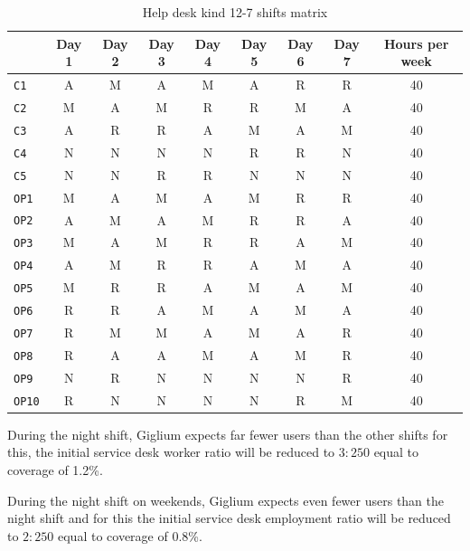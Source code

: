 \begin{table}[H]
	\centering
	\begin{tabular}{|l|c|c|c|c|c|c|c|c|} 
		\hline
		& \textbf{Day 1} & \textbf{Day 2} & \textbf{Day 3} & \textbf{Day 4} & \textbf{Day 5} & \textbf{Day 6} & \textbf{Day 7} & \textbf{Hours per week}\\ 
		\hline
		\texttt{C1} & A & M & A & M & A & R & R & 40\\
		\hline
		\texttt{C2} & M & A & M & R & R & M & A & 40\\
		\hline
		\texttt{C3} & A & R & R & A & M & A & M & 40\\
		\hline
		\texttt{C4} & N & N & N & N & R & R & N & 40\\
		\hline
		\texttt{C5} & N & N & R & R & N & N & N & 40\\
		\hline
		\texttt{OP1} & M & A & M & A & M & R & R & 40\\
		\hline
		\texttt{OP2} & A & M & A & M & R & R & A & 40\\
		\hline
		\texttt{OP3} & M & A & M & R & R & A & M & 40\\
		\hline
		\texttt{OP4} & A & M & R & R & A & M & A & 40\\
		\hline
		\texttt{OP5} & M & R & R & A & M & A & M & 40\\
		\hline
		\texttt{OP6} & R & R & A & M & A & M & A & 40\\
		\hline
		\texttt{OP7} & R & M & M & A & M & A & R & 40\\
		\hline
		\texttt{OP8} & R & A & A & M & A & M & R & 40\\
		\hline
		\texttt{OP9} & N & R & N & N & N & N & R & 40\\
		\hline
		\texttt{OP10} & R & N & N & N & N & R & M & 40\\
		\hline
	\end{tabular}
	\caption{Help desk kind 12{-}7 shifts matrix}\label{tab:shifts_24_7}
\end{table}

\begin{tcolorbox}
	During the night shift, Giglium expects far fewer users than the other shifts for this, the initial service desk worker ratio will be reduced to $3:250$ equal to coverage of 1.2\%. 
	
	During the night shift on weekends, Giglium expects even fewer users than the night shift and for this the initial service desk employment ratio will be reduced to $2:250$ equal to coverage of 0.8\%.
\end{tcolorbox}

